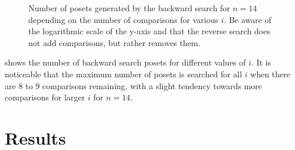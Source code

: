 \documentclass[twoside,leqno,twocolumn]{article}
\begin{document}
\begin{figure}[!b]
  \centering
  
  \caption{Number of posets generated by the backward search for $n = 14$ depending on the number of comparisons for various $i$.
    Be aware of the logarithmic scale of the y-axis and that the reverse search does not add comparisons, but rather removes them.}
  \label{fig:backward-posets-per-level}
\end{figure}

 shows the number of backward search posets for different values of $i$.
It is noticeable that the maximum number of posets is searched for all $i$ when there are $8$ to $9$ comparisons remaining, with a slight tendency towards more comparisons for larger $i$ for $n = 14$.

\section{Results}
\end{document}
